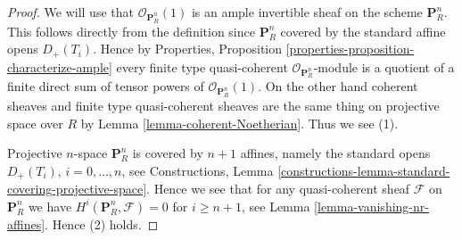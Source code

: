 \begin{proof}
We will use that $\mathcal{O}_{\mathbf{P}^n_R}(1)$ is an ample invertible
sheaf on
the scheme $\mathbf{P}^n_R$. This follows directly from the definition
since $\mathbf{P}^n_R$ covered by the standard affine opens $D_{+}(T_i)$.
Hence by
Properties, Proposition \ref{properties-proposition-characterize-ample}
every finite type quasi-coherent $\mathcal{O}_{\mathbf{P}^n_R}$-module
is a quotient of a finite direct sum of tensor powers of
$\mathcal{O}_{\mathbf{P}^n_R}(1)$. On the other hand coherent sheaves
and finite type quasi-coherent sheaves are the same thing on projective
space over $R$ by Lemma \ref{lemma-coherent-Noetherian}. Thus we see (1).

\medskip\noindent
Projective $n$-space $\mathbf{P}^n_R$ is covered by $n + 1$ affines,
namely the standard opens $D_{+}(T_i)$, $i = 0, \ldots, n$, see Constructions,
Lemma \ref{constructions-lemma-standard-covering-projective-space}.
Hence we see that for any quasi-coherent
sheaf $\mathcal{F}$ on $\mathbf{P}^n_R$
we have $H^i(\mathbf{P}^n_R, \mathcal{F}) = 0$ for $i \geq n + 1$,
see Lemma \ref{lemma-vanishing-nr-affines}. Hence (2) holds.


\end{proof}
